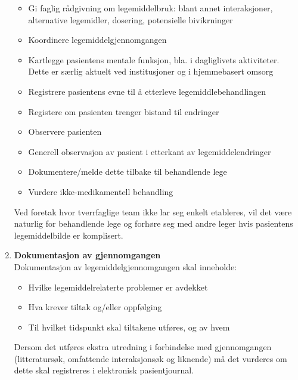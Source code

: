 \begin{enumerate}
\begin{itemize}
\item Gi faglig rådgivning om legemiddelbruk: blant annet interaksjoner, alternative legemidler, dosering, potensielle bivikrninger
\item Koordinere legemiddelgjennomgangen
\item Kartlegge pasientens mentale funksjon, bla. i dagliglivets aktiviteter. Dette er særlig aktuelt ved institusjoner og i hjemmebasert omsorg
\item Registrere pasientens evne til å etterleve legemiddlebehandlingen
\item Registere om pasienten trenger bistand til endringer
\item Observere pasienten
\item Generell observasjon av pasient i etterkant av legemiddelendringer
\item Dokumentere/melde dette tilbake til behandlende lege
\item Vurdere ikke-medikamentell behandling
\end{itemize}
Ved foretak hvor tverrfaglige team ikke lar seg enkelt etableres, vil det være naturlig for behandlende lege og forhøre seg med andre leger hvis pasientens legemiddelbilde er komplisert.

\item \textbf{Dokumentasjon av gjennomgangen} \\
Dokumentasjon av legemiddelgjennomgangen skal inneholde:
\begin{itemize}
\item Hvilke legemiddelrelaterte problemer er avdekket
\item Hva krever tiltak og/eller oppfølging
\item Til hvilket tidspunkt skal tiltakene utføres, og av hvem
\end{itemize}
Dersom det utføres ekstra utredning i forbindelse med gjennomgangen (litteratursøk, omfattende interaksjonsøk og liknende) må det vurderes om dette skal registreres i elektronisk pasientjournal.
\end{enumerate}





